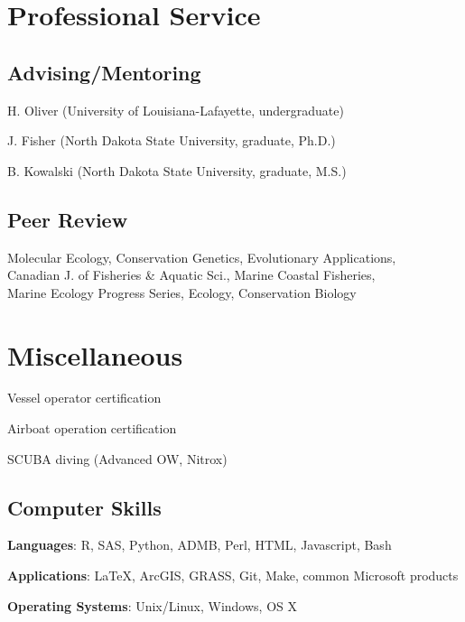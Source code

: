 \documentclass[letterpaper]{article}
\renewenvironment{itemize}{
  \begin{list}{}{
    \setlength{\leftmargin}{1em}
  }
}{
  \end{list}
}
\begin{document}
\section*{Professional Service}
  \subsection*{Advising/Mentoring}
   \begin{itemize}
    \item H. Oliver (University of Louisiana-Lafayette, undergraduate)
	  \item J. Fisher (North Dakota State University, graduate, Ph.D.)
	  \item B. Kowalski (North Dakota State University, graduate, M.S.)
   \end{itemize}
   
  \subsection*{Peer Review}
		\begin{itemize}
  		\item Molecular Ecology, Conservation Genetics, Evolutionary Applications, \\ 
      Canadian J. of Fisheries \& Aquatic Sci., Marine Coastal Fisheries, \\ 
      Marine Ecology Progress Series, Ecology, Conservation Biology
		\end{itemize}

\section*{Miscellaneous}
  \begin{itemize}
    \item Vessel operator certification
    \item Airboat operation certification
    \item SCUBA diving (Advanced OW, Nitrox)
  \end{itemize}

  \subsection*{Computer Skills}
  	\begin{itemize}
  		\item \textbf{Languages}: R, SAS,  Python, ADMB, Perl, HTML, Javascript, Bash
  		\item \textbf{Applications}: \LaTeX, ArcGIS, GRASS, Git, Make, common Microsoft products
      \item \textbf{Operating Systems}: Unix/Linux, Windows, OS X
  	\end{itemize}
    
\end{document}
